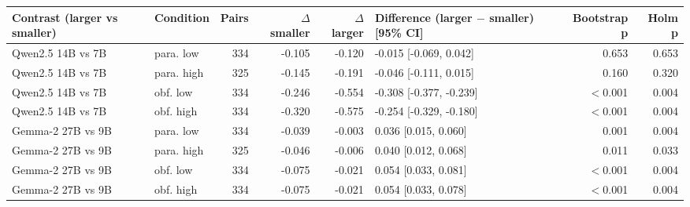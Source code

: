 \begin{tabular}{llrrrlrr}
\toprule
Contrast (larger vs smaller) & Condition & Pairs & $\Delta$ smaller & $\Delta$ larger & Difference (larger $-$ smaller) [95\% CI] & Bootstrap p & Holm p \\
\midrule
Qwen2.5 14B vs 7B & para. low & 334 & -0.105 & -0.120 & -0.015 [-0.069, 0.042] & 0.653 & 0.653 \\
Qwen2.5 14B vs 7B & para. high & 325 & -0.145 & -0.191 & -0.046 [-0.111, 0.015] & 0.160 & 0.320 \\
Qwen2.5 14B vs 7B & obf. low & 334 & -0.246 & -0.554 & -0.308 [-0.377, -0.239] & $<$0.001 & 0.004 \\
Qwen2.5 14B vs 7B & obf. high & 334 & -0.320 & -0.575 & -0.254 [-0.329, -0.180] & $<$0.001 & 0.004 \\
Gemma-2 27B vs 9B & para. low & 334 & -0.039 & -0.003 & 0.036 [0.015, 0.060] & 0.001 & 0.004 \\
Gemma-2 27B vs 9B & para. high & 325 & -0.046 & -0.006 & 0.040 [0.012, 0.068] & 0.011 & 0.033 \\
Gemma-2 27B vs 9B & obf. low & 334 & -0.075 & -0.021 & 0.054 [0.033, 0.081] & $<$0.001 & 0.004 \\
Gemma-2 27B vs 9B & obf. high & 334 & -0.075 & -0.021 & 0.054 [0.033, 0.078] & $<$0.001 & 0.004 \\
\bottomrule
\end{tabular}
